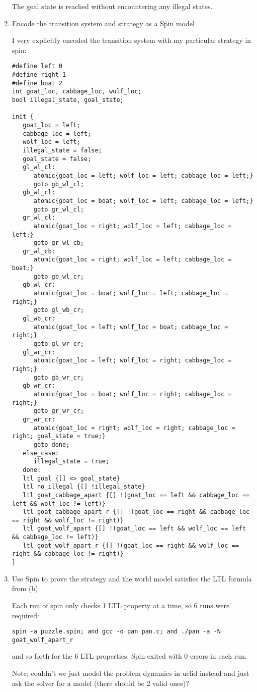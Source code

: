 \begin{enumerate}[label=(\alph*)]
    The goal state is reached without encountering any illegal states.

  \item {\color{blue}Encode the transition system and strategy as a Spin model}

    I very explicitly encoded the transition system with my particular strategy in spin:
    \begin{verbatim}
#define left 0
#define right 1
#define boat 2
int goat_loc, cabbage_loc, wolf_loc;
bool illegal_state, goal_state;

init {
   goat_loc = left;
   cabbage_loc = left;
   wolf_loc = left;
   illegal_state = false;
   goal_state = false;
   gl_wl_cl:
      atomic{goat_loc = left; wolf_loc = left; cabbage_loc = left;}
      goto gb_wl_cl;
   gb_wl_cl:
      atomic{goat_loc = boat; wolf_loc = left; cabbage_loc = left;}
      goto gr_wl_cl;
   gr_wl_cl:
      atomic{goat_loc = right; wolf_loc = left; cabbage_loc = left;}
      goto gr_wl_cb;
   gr_wl_cb:
      atomic{goat_loc = right; wolf_loc = left; cabbage_loc = boat;}
      goto gb_wl_cr;
   gb_wl_cr:
      atomic{goat_loc = boat; wolf_loc = left; cabbage_loc = right;}
      goto gl_wb_cr;
   gl_wb_cr:
      atomic{goat_loc = left; wolf_loc = boat; cabbage_loc = right;}
      goto gl_wr_cr;
   gl_wr_cr:
      atomic{goat_loc = left; wolf_loc = right; cabbage_loc = right;}
      goto gb_wr_cr;
   gb_wr_cr:
      atomic{goat_loc = boat; wolf_loc = right; cabbage_loc = right;}
      goto gr_wr_cr;
   gr_wr_cr:
      atomic{goat_loc = right; wolf_loc = right; cabbage_loc = right; goal_state = true;}
      goto done;
   else_case:
      illegal_state = true;
   done:
   ltl goal {[] <> goal_state}
   ltl no_illegal {[] !illegal_state}
   ltl goat_cabbage_apart {[] !(goat_loc == left && cabbage_loc == left && wolf_loc != left)}
   ltl goat_cabbage_apart_r {[] !(goat_loc == right && cabbage_loc == right && wolf_loc != right)}
   ltl goat_wolf_apart {[] !(goat_loc == left && wolf_loc == left && cabbage_loc != left)}
   ltl goat_wolf_apart_r {[] !(goat_loc == right && wolf_loc == right && cabbage_loc != right)}
}
    \end{verbatim}

  \item {\color{blue}Use Spin to prove the strategy and the world model satisfies the LTL formula from (b)}

    Each run of spin only checks 1 LTL property at a time, so 6 runs were required:

    \begin{verbatim}
spin -a puzzle.spin; and gcc -o pan pan.c; and ./pan -a -N goat_wolf_apart_r
    \end{verbatim}

    and so forth for the 6 LTL properties. Spin exited with 0 errors in each run.

    Note: couldn't we just model the problem dynamics in uclid instead and just ask the solver for a model (there should be 2 valid ones)?
\end{enumerate}

